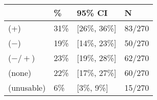 \begin{tabular}{llll}
\hline
& \% & 95\% CI  & N \\
\hline
(+) & 31\% & [26\%, 36\%] & 83/270\\
($-$) & 19\% & [14\%, 23\%] & 50/270\\
($-/+$) & 23\% & [19\%, 28\%] & 62/270\\
(none) & 22\% & [17\%, 27\%] & 60/270\\
(unusable) & 6\% & [3\%, 9\%] & 15/270\\
\hline
\end{tabular}
